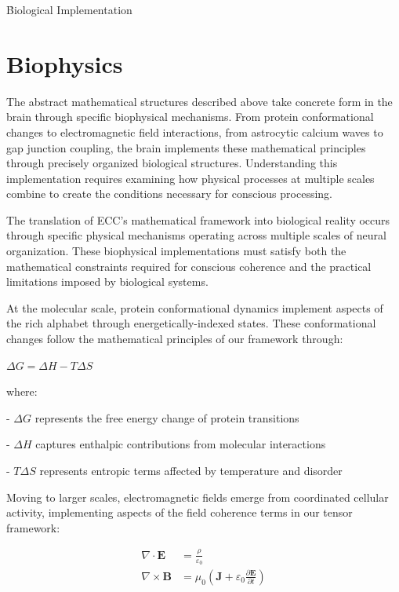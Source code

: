 \h{Biological Implementation}

\section{Biophysics}

\begin{refsection}

The abstract mathematical structures described above take concrete form in the brain through specific biophysical mechanisms. From protein conformational changes to electromagnetic field interactions, from astrocytic calcium waves to gap junction coupling, the brain implements these mathematical principles through precisely organized biological structures. Understanding this implementation requires examining how physical processes at multiple scales combine to create the conditions necessary for conscious processing.

The translation of ECC's mathematical framework into biological reality occurs through specific physical mechanisms operating across multiple scales of neural organization. These biophysical implementations must satisfy both the mathematical constraints required for conscious coherence and the practical limitations imposed by biological systems.

At the molecular scale, protein conformational dynamics implement aspects of the rich alphabet through energetically-indexed states. These conformational changes follow the mathematical principles of our framework through:

$\Delta G = \Delta H - T\Delta S$

where:

- $\Delta G$ represents the free energy change of protein transitions

- $\Delta H$ captures enthalpic contributions from molecular interactions

- $T \Delta S$ represents entropic terms affected by temperature and disorder

Moving to larger scales, electromagnetic fields emerge from coordinated cellular activity, implementing aspects of the field coherence terms in our tensor framework:

\begin{align}
\nabla \cdot \mathbf{E} &= \frac{\rho}{\varepsilon_0} \\
\nabla \times \mathbf{B} &= \mu_0(\mathbf{J} + \varepsilon_0\frac{\partial \mathbf{E}}{\partial t})
\end{align}


\end{refsection}
